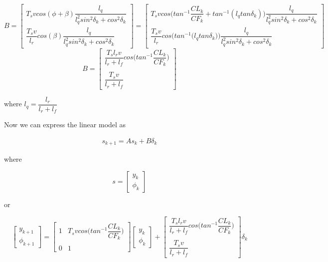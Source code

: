 \begin{equation}
 B =
  \begin{bmatrix}
    T_s v cos(\phi + \beta) \dfrac{l_q}{l_q^2 sin^2\delta_k + cos^2\delta_k} \\
    \dfrac{T_s v}{l_r} cos(\beta) \dfrac{l_q}{l_q^2 sin^2\delta_k + cos^2\delta_k}
  \end{bmatrix}
  =
  \begin{bmatrix}
    T_s v cos\Big(tan^{-1}\dfrac{CL_k}{CF_k} + tan^{-1} (l_q tan\delta_k)\Big) \dfrac{l_q}{l_q^2 sin^2\delta_k + cos^2\delta_k} \\
    \dfrac{T_s v}{l_r} cos\Bigg(tan^{-1} \Big(l_q tan\delta_k\Big)\Bigg) \dfrac{l_q}{l_q^2 sin^2\delta_k + cos^2\delta_k}
  \end{bmatrix}
\end{equation}
\begin{equation}
 B =
  \begin{bmatrix}
    \dfrac{T_s l_r v}{l_r + l_f} cos\Big(tan^{-1}\dfrac{CL_k}{CF_k}\Big) \\\\
    \dfrac{T_s v}{l_r+l_f}
  \end{bmatrix}
\end{equation}

where $l_q = \dfrac{l_r}{l_r + l_f}$




Now we can express the linear model as

\begin{align}
  s_{k+1} = A s_k + B \delta_k
\end{align}

where

\begin{equation}
  s=
  \begin{bmatrix}
    y_{k} \\
    \phi_{k}
  \end{bmatrix}
\end{equation}

or

\begin{equation}
  \begin{bmatrix}
    y_{k+1} \\
    \phi_{k+1}
  \end{bmatrix}
  =
  \begin{bmatrix}
    1 & T_s v cos\Big(tan^{-1}\dfrac{CL_k}{CF_k}\Big) \\\\
    0 & 1
  \end{bmatrix}
  \begin{bmatrix}
    y_{k} \\
    \phi_{k}
  \end{bmatrix}
  +
  \begin{bmatrix}
    \dfrac{T_s l_r v}{l_r + l_f} cos\Big(tan^{-1}\dfrac{CL_k}{CF_k}\Big) \\\\
    \dfrac{T_s v}{l_r+l_f}
  \end{bmatrix}
  \delta_{k}
\end{equation}

